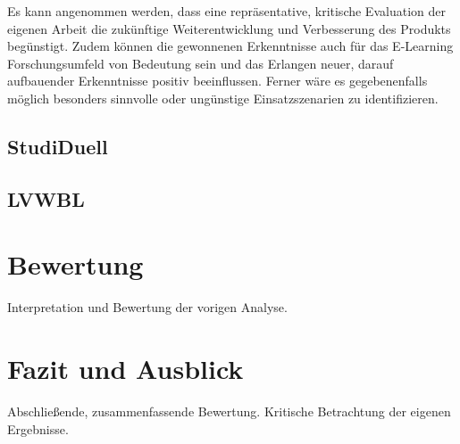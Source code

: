 \documentclass[conference]{IEEEtran}
\begin{document}
Es kann angenommen werden, dass eine repräsentative, kritische Evaluation der eigenen Arbeit die zukünftige Weiterentwicklung und Verbesserung des Produkts begünstigt. Zudem können die gewonnenen Erkenntnisse auch für das E-Learning Forschungsumfeld von Bedeutung sein und das Erlangen neuer, darauf aufbauender Erkenntnisse positiv beeinflussen. Ferner wäre es gegebenenfalls möglich besonders sinnvolle oder ungünstige Einsatzszenarien zu identifizieren. 

\subsection{StudiDuell}


\subsection{LVWBL}


\section{Bewertung}
Interpretation und Bewertung der vorigen Analyse.


\section{Fazit und Ausblick}
Abschließende, zusammenfassende Bewertung. Kritische Betrachtung der eigenen Ergebnisse.





\end{document}
